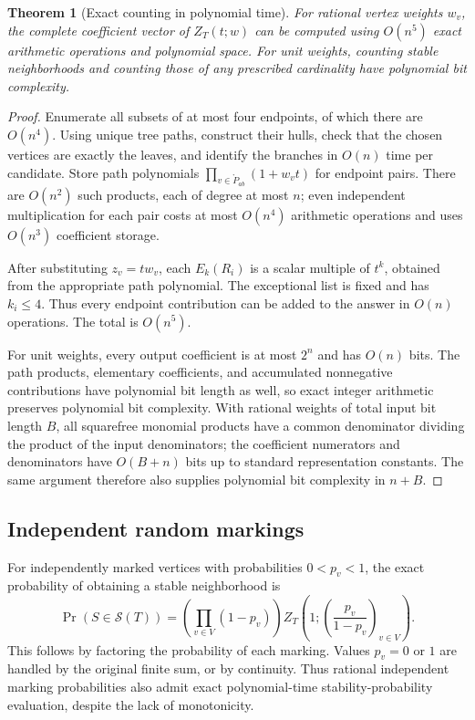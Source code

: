 \documentclass[11pt]{article}
\numberwithin{equation}{section}
\newtheorem{theorem}{Theorem}[section]
\theoremstyle{definition}
\newcommand{\Stab}{\mathcal S}
\newcommand{\pathin}[2]{\mathring P_{#1#2}}
\begin{document}
\begin{theorem}[Exact counting in polynomial time]\label{mts:thm:counting}
For rational vertex weights $w_v$, the complete coefficient vector of
$Z_T(t;w)$ can be computed using $O(n^5)$ exact arithmetic operations and
polynomial space. For unit weights, counting stable neighborhoods and
counting those of any prescribed cardinality have polynomial bit
complexity.
\end{theorem}
\begin{proof}
Enumerate all subsets of at most four endpoints, of which there are
$O(n^4)$. Using unique tree paths, construct their hulls, check that the
chosen vertices are exactly the leaves, and identify the branches in
$O(n)$ time per candidate. Store path polynomials
$\prod_{v\in\pathin ab}(1+w_vt)$ for endpoint pairs. There are $O(n^2)$
such products, each of degree at most $n$; even independent multiplication
for each pair costs at most $O(n^4)$ arithmetic operations and uses
$O(n^3)$ coefficient storage.

After substituting $z_v=tw_v$, each $E_k(R_i)$ is a scalar multiple of
$t^k$, obtained from the appropriate path polynomial. The exceptional
list is fixed and has $k_i\le4$. Thus every endpoint contribution can be
added to the answer in $O(n)$ operations. The total is $O(n^5)$.

For unit weights, every output coefficient is at most $2^n$ and has
$O(n)$ bits. The path products, elementary coefficients, and accumulated
nonnegative contributions have polynomial bit length as well, so exact
integer arithmetic preserves polynomial bit complexity. With rational
weights of total input bit length $B$, all squarefree monomial products
have a common denominator dividing the product of the input denominators;
the coefficient numerators and denominators have $O(B+n)$ bits up to
standard representation constants. The same argument therefore also
supplies polynomial bit complexity in $n+B$.
\end{proof}

\subsection{Independent random markings}

For independently marked vertices with probabilities $0<p_v<1$, the exact
probability of obtaining a stable neighborhood is
\begin{equation}
 \Pr(S\in\Stab(T))
 =\left(\prod_{v\in V}(1-p_v)\right)
     Z_T\left(1;\left(\frac{p_v}{1-p_v}\right)_{v\in V}\right).
 \label{mts:eq:probability}
\end{equation}
This follows by factoring the probability of each marking. Values $p_v=0$
or $1$ are handled by the original finite sum, or by continuity. Thus
rational independent marking probabilities also admit exact polynomial-time
stability-probability evaluation, despite the lack of monotonicity.
\end{document}
